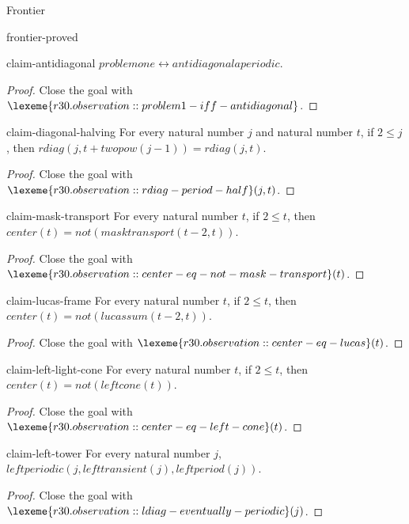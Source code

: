 \begin{lexlean}{Frontier}
\begin{section}{frontier-proved}
\begin{theorem}{claim-antidiagonal}
\(problemone ↔ antidiagonalaperiodic\).
\begin{proof}
Close the goal with \(\lexeme{r30.observation::problem1-iff-antidiagonal}\).
\end{proof}
\end{theorem}

\begin{theorem}{claim-diagonal-halving}
For every natural number \(j\) and natural number \(t\), if \(2 ≤ j\), then \(rdiag(j, t + twopow(j - 1)) = rdiag(j, t)\).
\begin{proof}
Close the goal with \(\lexeme{r30.observation::rdiag-period-half}(j, t)\).
\end{proof}
\end{theorem}

\begin{theorem}{claim-mask-transport}
For every natural number \(t\), if \(2 ≤ t\), then \(center(t) = not(masktransport(t - 2, t))\).
\begin{proof}
Close the goal with \(\lexeme{r30.observation::center-eq-not-mask-transport}(t)\).
\end{proof}
\end{theorem}

\begin{theorem}{claim-lucas-frame}
For every natural number \(t\), if \(2 ≤ t\), then \(center(t) = not(lucassum(t - 2, t))\).
\begin{proof}
Close the goal with \(\lexeme{r30.observation::center-eq-lucas}(t)\).
\end{proof}
\end{theorem}

\begin{theorem}{claim-left-light-cone}
For every natural number \(t\), if \(2 ≤ t\), then \(center(t) = not(leftcone(t))\).
\begin{proof}
Close the goal with \(\lexeme{r30.observation::center-eq-left-cone}(t)\).
\end{proof}
\end{theorem}

\begin{theorem}{claim-left-tower}
For every natural number \(j\), \(leftperiodic(j, lefttransient(j), leftperiod(j))\).
\begin{proof}
Close the goal with \(\lexeme{r30.observation::ldiag-eventually-periodic}(j)\).
\end{proof}
\end{theorem}


\end{section}
\end{lexlean}

